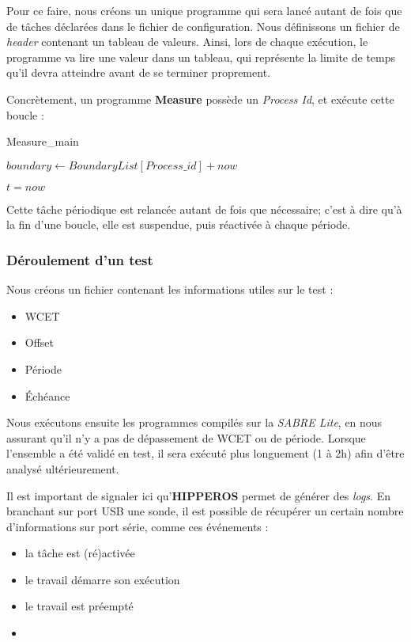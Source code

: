 	Pour ce faire, nous créons un unique programme qui sera lancé autant de fois que de tâches déclarées 
	dans le fichier de configuration. 
	Nous définissons un fichier de \textit{header} contenant un tableau de valeurs. 
	Ainsi, lors de chaque exécution, le programme va lire une valeur dans un tableau, qui représente la 
	limite de temps qu'il devra atteindre avant de se terminer proprement.\newline
	
	Concrètement, un programme \textbf{Measure} possède un \textit{Process Id}, et exécute cette boucle :

	\label{algomeasure}
	\begin{algorithm}[H]
		\caption{Measure\_main}
		\begin{algorithmic}
			\STATE $boundary \leftarrow BoundaryList[Process\_id] + now$
			\REPEAT \item $t = now$
		\end{algorithmic}
	\end{algorithm}

	Cette tâche périodique est relancée autant de fois que nécessaire; c'est à dire qu'à la fin 
	d'une boucle, elle est suspendue, puis réactivée à chaque période.
	
	\subsubsection{Déroulement d'un test}
	Nous créons un fichier contenant les informations utiles sur le test :
	\begin{itemize}
		\item WCET
		\item Offset
		\item Période
		\item Échéance
	\end{itemize}
	Nous exécutons ensuite les programmes compilés sur la \textit{SABRE Lite}, en nous assurant qu'il n'y a pas 
	de dépassement de WCET ou de période. Lorsque l'ensemble a été validé en test, il sera 
	exécuté plus longuement (1 à 2h) afin d'être analysé ultérieurement.\newline

	Il est important de signaler ici qu'\textbf{HIPPEROS} permet de générer des \textit{logs}.
	En branchant sur port USB une sonde, il est possible de récupérer 
	un certain nombre d'informations sur port série, comme ces événements :
	\begin{itemize}
		\item la tâche est (ré)activée
		\item le travail démarre son exécution
		\item le travail est préempté
		\item 
	\end{itemize}
	
